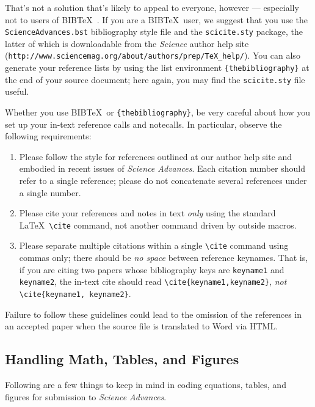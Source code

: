 \documentclass[12pt]{article}
\begin{document}
That's not a solution that's likely to appeal to everyone, however ---
especially not to users of B{\small{IB}}\TeX\ \cite{inclme}.  If you
are a B{\small{IB}}\TeX\ user, we suggest that you use the
\texttt{ScienceAdvances.bst} bibliography style file and the
\texttt{scicite.sty} package, the latter of which is downloadable from the \textit{Science} author help site
(\verb+http://www.sciencemag.org/about/authors/prep/TeX_help/+).  You can also
generate your reference lists by using the list environment
\texttt{\{thebibliography\}} at the end of your source document; here
again, you may find the \texttt{scicite.sty} file useful.

Whether you use B{\small{IB}}\TeX\ or \texttt{\{thebibliography\}}, be
very careful about how you set up your in-text reference calls and
notecalls.  In particular, observe the following requirements:

\begin{enumerate}
\item Please follow the style for references outlined at our author
  help site and embodied in recent issues of {\it Science Advances}.  Each
  citation number should refer to a single reference; please do not
  concatenate several references under a single number.
\item Please cite your references and notes in text {\it only\/} using
  the standard \LaTeX\ \verb+\cite+ command, not another command
  driven by outside macros.
\item Please separate multiple citations within a single \verb+\cite+
  command using commas only; there should be {\it no space\/}
  between reference keynames.  That is, if you are citing two
  papers whose bibliography keys are \texttt{keyname1} and
  \texttt{keyname2}, the in-text cite should read
  \verb+\cite{keyname1,keyname2}+, {\it not\/}
  \verb+\cite{keyname1, keyname2}+.
\end{enumerate}

\noindent Failure to follow these guidelines could lead
to the omission of the references in an accepted paper when the source
file is translated to Word via HTML.

\subsection*{Handling Math, Tables, and Figures}

Following are a few things to keep in mind in coding equations,
tables, and figures for submission to {\it Science Advances}.
\end{document}
